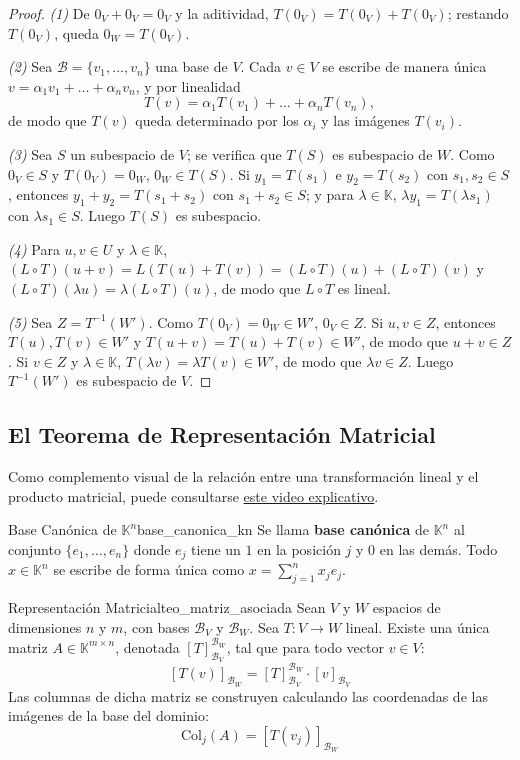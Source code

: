 \documentclass[11pt, a4paper]{article}
\begin{document}
\begin{proof}
\textit{(1)} De $0_V + 0_V = 0_V$ y la aditividad, $T(0_V) = T(0_V) + T(0_V)$; restando $T(0_V)$, queda $0_W = T(0_V)$.

\textit{(2)} Sea $\mathcal{B} = \{v_1, \dots, v_n\}$ una base de $V$. Cada $v \in V$ se escribe de manera única $v = \alpha_1 v_1 + \dots + \alpha_n v_n$, y por linealidad
\[
T(v) = \alpha_1 T(v_1) + \dots + \alpha_n T(v_n),
\]
de modo que $T(v)$ queda determinado por los $\alpha_i$ y las imágenes $T(v_i)$.

\textit{(3)} Sea $S$ un subespacio de $V$; se verifica que $T(S)$ es subespacio de $W$. Como $0_V \in S$ y $T(0_V) = 0_W$, $0_W \in T(S)$. Si $y_1 = T(s_1)$ e $y_2 = T(s_2)$ con $s_1, s_2 \in S$, entonces $y_1 + y_2 = T(s_1 + s_2)$ con $s_1 + s_2 \in S$; y para $\lambda \in \mathbb{K}$, $\lambda y_1 = T(\lambda s_1)$ con $\lambda s_1 \in S$. Luego $T(S)$ es subespacio.

\textit{(4)} Para $u, v \in U$ y $\lambda \in \mathbb{K}$, $(L \circ T)(u + v) = L(T(u) + T(v)) = (L \circ T)(u) + (L \circ T)(v)$ y $(L \circ T)(\lambda u) = \lambda (L \circ T)(u)$, de modo que $L \circ T$ es lineal.

\textit{(5)} Sea $Z = T^{-1}(W')$. Como $T(0_V) = 0_W \in W'$, $0_V \in Z$. Si $u, v \in Z$, entonces $T(u), T(v) \in W'$ y $T(u+v) = T(u) + T(v) \in W'$, de modo que $u + v \in Z$. Si $v \in Z$ y $\lambda \in \mathbb{K}$, $T(\lambda v) = \lambda T(v) \in W'$, de modo que $\lambda v \in Z$. Luego $T^{-1}(W')$ es subespacio de $V$.
\end{proof}

\subsection{El Teorema de Representación Matricial}

Como complemento visual de la relación entre una transformación lineal y el producto matricial, puede consultarse \href{https://youtu.be/3gxjK9zkKqc?si=_vvIvbiUcNyruPvx}{este video explicativo}.

\begin{definicion}{Base Canónica de $\mathbb{K}^n$}{base_canonica_kn}
Se llama \textbf{base canónica} de $\mathbb{K}^n$ al conjunto $\{e_1, \dots, e_n\}$ donde $e_j$ tiene un $1$ en la posición $j$ y $0$ en las demás. Todo $x \in \mathbb{K}^n$ se escribe de forma única como $x = \sum_{j=1}^n x_j e_j$.
\end{definicion}

\begin{teorema}{Representación Matricial}{teo_matriz_asociada}
Sean $V$ y $W$ espacios de dimensiones $n$ y $m$, con bases $\mathcal{B}_V$ y $\mathcal{B}_W$. Sea $T: V \to W$ lineal.
Existe una única matriz $A \in \mathbb{K}^{m \times n}$, denotada $[T]_{\mathcal{B}_V}^{\mathcal{B}_W}$, tal que para todo vector $v \in V$:
\[
[T(v)]_{\mathcal{B}_W} = [T]_{\mathcal{B}_V}^{\mathcal{B}_W} \cdot [v]_{\mathcal{B}_V}
\]
Las columnas de dicha matriz se construyen calculando las coordenadas de las imágenes de la base del dominio:
\[ \text{Col}_j(A) = [T(v_j)]_{\mathcal{B}_W} \]
\end{teorema}
\end{document}
